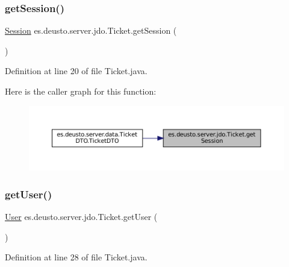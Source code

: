 \subsubsection{\texorpdfstring{getSession()}{getSession()}}
{\footnotesize\ttfamily \mbox{\hyperlink{classes_1_1deusto_1_1server_1_1jdo_1_1_session}{Session}} es.\+deusto.\+server.\+jdo.\+Ticket.\+get\+Session (\begin{DoxyParamCaption}{ }\end{DoxyParamCaption})}



Definition at line 20 of file Ticket.\+java.

Here is the caller graph for this function\+:
\nopagebreak
\begin{figure}[H]
\begin{center}
\leavevmode
\includegraphics[width=350pt]{classes_1_1deusto_1_1server_1_1jdo_1_1_ticket_a60d6aebd66fee1d5d0ebde52540dcac9_icgraph}
\end{center}
\end{figure}
\mbox{\label{classes_1_1deusto_1_1server_1_1jdo_1_1_ticket_a6c4819e9c6938564059c7957bf6a01d1}} 
\subsubsection{\texorpdfstring{getUser()}{getUser()}}
{\footnotesize\ttfamily \mbox{\hyperlink{classes_1_1deusto_1_1server_1_1jdo_1_1_user}{User}} es.\+deusto.\+server.\+jdo.\+Ticket.\+get\+User (\begin{DoxyParamCaption}{ }\end{DoxyParamCaption})}



Definition at line 28 of file Ticket.\+java.

\mbox{\label{classes_1_1deusto_1_1server_1_1jdo_1_1_ticket_a175ab896194b8a3734e335ff63440151}} 
